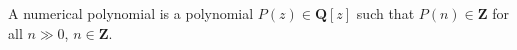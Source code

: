 A numerical polynomial is a polynomial $P(z) \in \mathbf{Q}[z]$ such that $P(n) \in \mathbf{Z}$ for all $n \gg 0$, $n \in \mathbf{Z}$.
